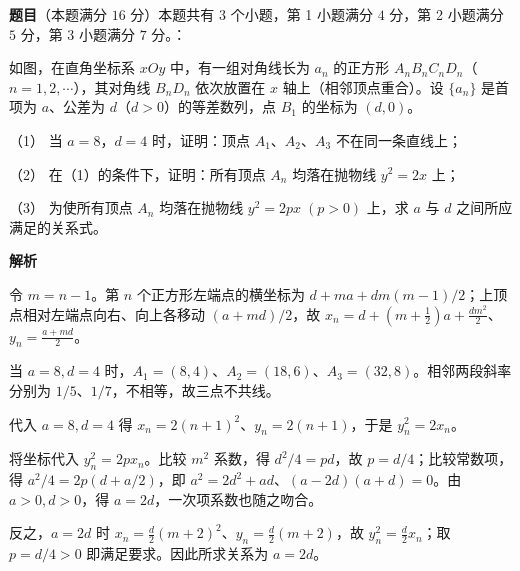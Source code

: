 \begin{answer}

\textbf{题目}（本题满分 $16$ 分）本题共有 $3$ 个小题，第 1 小题满分 $4$ 分，第 2 小题满分 $5$ 分，第 3 小题满分 $7$ 分。：

如图，在直角坐标系 $xOy$ 中，有一组对角线长为 $a_n$ 的正方形 $A_nB_nC_nD_n$（$n=1,2,\cdots$），其对角线 $B_nD_n$ 依次放置在 $x$ 轴上（相邻顶点重合）。设 $\{a_n\}$ 是首项为 $a$、公差为 $d$（$d>0$）的等差数列，点 $B_1$ 的坐标为 $(d,0)$。

（1） 当 $a=8$，$d=4$ 时，证明：顶点 $A_1$、$A_2$、$A_3$ 不在同一条直线上；

（2） 在（1）的条件下，证明：所有顶点 $A_n$ 均落在抛物线 $y^2=2x$ 上；

（3） 为使所有顶点 $A_n$ 均落在抛物线 $y^2=2px\;(p>0)$ 上，求 $a$ 与 $d$ 之间所应满足的关系式。
\nopagebreak[4]
\begin{center}\end{center}
\nopagebreak[4]
\textbf{解析}

令 $m=n-1$。第 $n$ 个正方形左端点的横坐标为 $d+ma+dm(m-1)/2$；上顶点相对左端点向右、向上各移动 $(a+md)/2$，故 $x_n=d+(m+\frac12)a+\frac{dm^2}{2}$、$y_n=\frac{a+md}{2}$。


当 $a=8,d=4$ 时，$A_1=(8,4)$、$A_2=(18,6)$、$A_3=(32,8)$。相邻两段斜率分别为 $1/5$、$1/7$，不相等，故三点不共线。


代入 $a=8,d=4$ 得 $x_n=2(n+1)^2$、$y_n=2(n+1)$，于是 $y_n^2=2x_n$。


将坐标代入 $y_n^2=2px_n$。比较 $m^2$ 系数，得 $d^2/4=pd$，故 $p=d/4$；比较常数项，得 $a^2/4=2p(d+a/2)$，即 $a^2=2d^2+ad$、$(a-2d)(a+d)=0$。由 $a>0,d>0$，得 $a=2d$，一次项系数也随之吻合。

反之，$a=2d$ 时 $x_n=\frac d2(m+2)^2$、$y_n=\frac d2(m+2)$，故 $y_n^2=\frac d2x_n$；取 $p=d/4>0$ 即满足要求。因此所求关系为 $a=2d$。




\end{answer}
